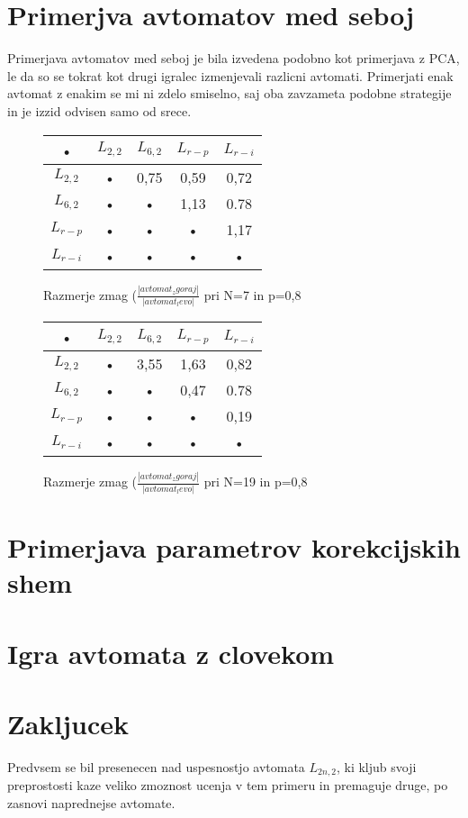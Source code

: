 \documentclass[10pt,a4paper]{report}
\begin{document}
\section{Primerjva avtomatov med seboj}

Primerjava avtomatov med seboj je bila izvedena podobno kot primerjava z PCA, le da so se tokrat kot drugi igralec izmenjevali razlicni avtomati. Primerjati enak avtomat z enakim se mi ni zdelo smiselno, saj oba zavzameta podobne strategije in je izzid odvisen samo od srece.

\begin{figure}[h!]
\begin{center}
\begin{tabular}{|c|c|c|c|c|}
\hline • & $L_{2,2}$ & $L_{6,2}$ & $L_{r-p}$ & $L_{r-i}$ \\ 
\hline $L_{2,2}$ & • & 0,75 & 0,59 & 0,72 \\ 
\hline $L_{6,2}$ & • & • & 1,13 & 0.78 \\ 
\hline $L_{r-p}$ & • & • & • & 1,17 \\ 
\hline $L_{r-i}$ & • & • & • & • \\ 
\hline 
\end{tabular} 
\end{center}
\caption{Razmerje zmag ($\frac{|avtomat_zgoraj|}{|avtomat_levo|}$ pri N=7 in p=0,8}
\end{figure}

\begin{figure}[h!]
\begin{center}
\begin{tabular}{|c|c|c|c|c|}
\hline • & $L_{2,2}$ & $L_{6,2}$ & $L_{r-p}$ & $L_{r-i}$ \\ 
\hline $L_{2,2}$ & • & 3,55 & 1,63 & 0,82 \\ 
\hline $L_{6,2}$ & • & • & 0,47 & 0.78 \\ 
\hline $L_{r-p}$ & • & • & • & 0,19 \\ 
\hline $L_{r-i}$ & • & • & • & • \\ 
\hline 
\end{tabular} 
\end{center}
\caption{Razmerje zmag ($\frac{|avtomat_zgoraj|}{|avtomat_levo|}$ pri N=19 in p=0,8}
\end{figure}

\section{Primerjava parametrov korekcijskih shem}

\section{Igra avtomata z clovekom}

\section{Zakljucek}

Predvsem se bil presenecen nad uspesnostjo avtomata $L_{2n,2}$, ki kljub svoji preprostosti kaze veliko zmoznost ucenja v tem primeru in premaguje druge, po zasnovi naprednejse avtomate.
\end{document}
